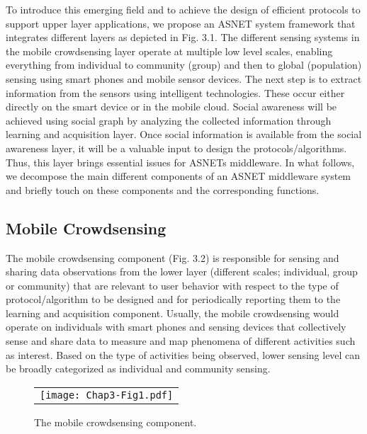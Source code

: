 To introduce this emerging field and to achieve the design of efficient protocols to support upper layer applications, we propose an ASNET system framework that integrates different layers as depicted in Fig. 3.1. The different sensing systems in the mobile crowdsensing layer operate at multiple low level scales, enabling everything from individual to community (group) and then to global (population) sensing using smart phones and mobile sensor devices. The next step is to extract information from the sensors using intelligent technologies. These occur either directly on the smart device or in the mobile cloud. Social awareness will be achieved using social graph by analyzing the collected information through learning and acquisition layer. Once social information is available from the social awareness layer, it will be a valuable input to design the protocols/algorithms. Thus, this layer brings essential issues for ASNETs middleware. In what follows, we decompose the main different components of an ASNET middleware system and briefly touch on these components and the corresponding functions.

\subsection{Mobile Crowdsensing}\label{Chap3_02_01}
The mobile crowdsensing component (Fig. 3.2) is responsible for sensing and sharing data observations from the lower layer (different scales; individual, group or community) that are relevant to user behavior with respect to the type of protocol/algorithm to be designed and for periodically reporting them to the learning and acquisition component. Usually, the mobile crowdsensing would operate on individuals with smart phones and sensing devices that collectively sense and share data to measure and map phenomena of different activities such as interest. Based on the type of activities being observed, lower sensing level can be broadly categorized as individual and community sensing.
\begin{figure}[t]
\begin{center}
  \begin{tabular}{c}
  \texttt{[image: Chap3-Fig1.pdf]}
  \end{tabular}
  \caption{The mobile crowdsensing component.}
\end{center}
\end{figure}

